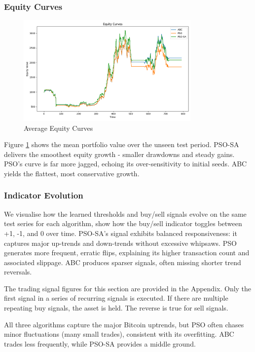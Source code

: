 \documentclass[a4paper, 12pt]{extarticle}
\begin{document}
\subsubsection{Equity Curves}
\begin{figure}[h!]
    \centering
    \includegraphics[width=0.8\textwidth]{./assets/equity.png}
    \caption{Average Equity Curves}
    \label{fig:equity}
\end{figure}
Figure \ref{fig:equity} shows the mean portfolio value over the unseen test period. PSO-SA delivers the smoothest equity growth - smaller drawdowns and steady gains. PSO's curve is far more jagged, echoing its over-sensitivity to initial seeds. ABC yields the flattest, most conservative growth. 

\subsubsection{Indicator Evolution}

We visualise how the learned thresholds and buy/sell signals evolve on the same test series for each algorithm, show how the buy/sell indicator toggles between +1, -1, and 0 over time. PSO-SA's signal exhibits balanced responsiveness: it captures major up-trends and down-trends without excessive whipsaws. PSO generates more frequent, erratic flips, explaining its higher transaction count and associated slippage. ABC produces sparser signals, often missing shorter trend reversals. 

The trading signal figures for this section are provided in the Appendix. Only the first signal in a series of recurring signals is executed. If there are multiple repeating buy signals, the asset is held. The reverse is true for sell signals.

All three algorithms capture the major Bitcoin uptrends, but PSO often chases minor fluctuations (many small trades), consistent with its overfitting. ABC trades less frequently, while PSO-SA provides a middle ground. 
\end{document}

